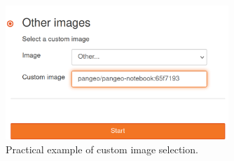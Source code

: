 \begin{figure}[htbp]
    \centering
    \includegraphics[width=0.75\textwidth]{figures/pangeo_open.pdf}
    \caption{Practical example of custom image selection. }
    \label{img:pangeo_opne}
\end{figure}




